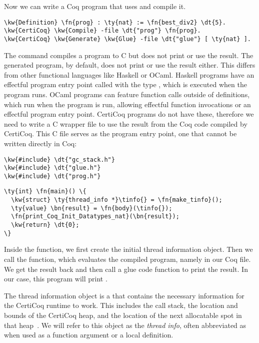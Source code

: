 Now we can write a Coq program that uses  and compile it.

\begin{Verbatim}
\kw{Definition} \fn{prog} : \ty{nat} := \fn{best_div2} \dt{5}.
\kw{CertiCoq} \kw{Compile} -file \dt{"prog"} \fn{prog}.
\kw{CertiCoq} \kw{Generate} \kw{Glue} -file \dt{"glue"} [ \ty{nat} ].
\end{Verbatim}

The  command compiles a program to C but does not print or use the result. The generated program, by default, does not print or use the result either. This differs from other functional languages like Haskell or OCaml. Haskell programs have an effectful program entry point called  with the type , which is executed when the program runs. OCaml programs can feature function calls outside of definitions, which run when the program is run, allowing effectful function invocations or an effectful program entry point. CertiCoq programs do not have these, therefore we need to write a C wrapper file to use the result from the Coq code compiled by CertiCoq. This C file serves as the program entry point, one that cannot be written directly in Coq:

\begin{Verbatim}
\kw{#include} \dt{"gc_stack.h"}
\kw{#include} \dt{"glue.h"}
\kw{#include} \dt{"prog.h"}
\end{Verbatim}
\newpage{}

\begin{Verbatim}
\ty{int} \fn{main}() \{
  \kw{struct} \ty{thread_info *}\tinfo{} = \fn{make_tinfo}();
  \ty{value} \bn{result} = \fn{body}(\tinfo{});
  \fn{print_Coq_Init_Datatypes_nat}(\bn{result});
  \kw{return} \dt{0};
\}
\end{Verbatim}

Inside the  function, we first create the initial thread information object. Then we call the  function, which evaluates the compiled program, namely  in our Coq file. We get the result back and then call a glue code function to print the result. In our case, this program will print .

The thread information object is a  that contains the necessary information for the CertiCoq runtime to work. This includes the call stack, the location and bounds of the \gls{CertiCoq heap}, and the location of the next allocatable spot in that heap~\cite{belanger2019verified, belanger2019certified, paraskevopoulou2020verified}. We will refer to this object as the \emph{\gls{thread info}}, often abbreviated as \tinfo{} when used as a function argument or a local definition.

